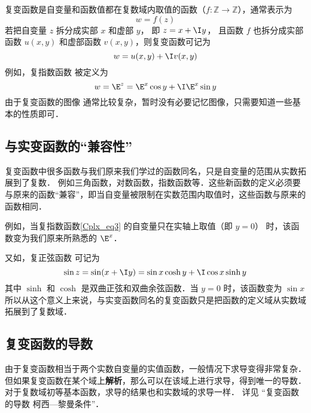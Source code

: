 

复变函数是自变量和函数值都在复数域内取值的函数（$f:\mathbb Z \to \mathbb Z$），通常表示为
\begin{equation}
w = f(z)
\end{equation}
若把自变量 $z$ 拆分成实部 $x$ 和虚部 $y$， 即 $z = x + \I y$， 且函数 $f$ 也拆分成实部函数 $u(x,y)$ 和虚部函数 $v(x,y)$，则复变函数可记为
\begin{equation}
w = u(x,y) + \I v(x,y)
\end{equation}
例如，复指数函数 被定义为
\begin{equation}\label{Cplx_eq3}
w = \E^z = \E^x \cos y + \I \E^x\sin y
\end{equation}
由于复变函数的图像%
通常比较复杂，暂时没有必要记忆图像，只需要知道一些基本的性质即可．

\subsection{与实变函数的“兼容性”}
复变函数中很多函数与我们原来我们学过的函数同名，只是自变量的范围从实数拓展到了复数． 例如三角函数，对数函数，指数函数等．这些新函数的定义必须要与原来的函数“兼容”，即当自变量被限制在实数范围内取值时，这些函数与原来的函数相同．

例如，当复指数函数\autoref{Cplx_eq3} 的自变量只在实轴上取值（即 $y = 0$） 时，该函数变为我们原来所熟悉的 $\E^x$． 

又如，复正弦函数 可记为
\begin{equation}
\sin z = \sin(x + \I y) = \sin x\cosh y + \I\cos x\sinh y
\end{equation}
其中 $\sinh $ 和 $\cosh $ 是双曲正弦和双曲余弦函数．当 $y = 0$ 时，该函数变为 $\sin x$ 
所以从这个意义上来说，与实变函数同名的复变函数只是把函数的定义域从实数域拓展到了复数域．

\subsection{复变函数的导数}
由于复变函数相当于两个实数自变量的实值函数，一般情况下求导变得非常复杂．但如果复变函数在某个域上\textbf{解析}，那么可以在该域上进行求导，得到唯一的导数．对于复数域初等基本函数，求导的结果也和实数域的求导一样． 详见 “复变函数的导数 柯西—黎曼条件”．
